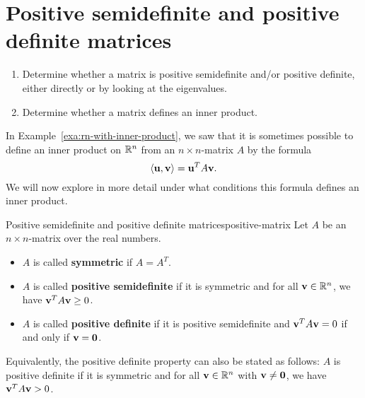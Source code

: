 \section{Positive semidefinite and positive definite matrices}

\begin{outcome}
  \begin{enumerate}
  \item Determine whether a matrix is positive semidefinite and/or
    positive definite, either directly or by looking at the
    eigenvalues.
  \item Determine whether a matrix defines an inner product.
  \end{enumerate}
\end{outcome}

In Example~\ref{exa:rn-with-inner-product}, we saw that it is
sometimes possible to define an inner product on $\mathbb{R}^n$ from an
$n\times n$-matrix $A$ by the formula
\begin{equation*}
  \iprod{\vect{u},\vect{v}} = \vect{u}^T A \vect{v}.
\end{equation*}
We will now explore in more detail under what conditions this formula
defines an inner product.

\begin{definition}{Positive semidefinite and positive definite matrices}{positive-matrix}
  Let $A$ be an $n\times n$-matrix over the real numbers.
  \begin{itemize}
  \item $A$ is called \textbf{symmetric}%
     if $A=A^T$.
  \item $A$ is called \textbf{positive semidefinite}%
     if it is symmetric and for all
    $\vect{v}\in\R^n$, we have $\vect{v}^TA\vect{v}\geq 0$.
  \item $A$ is called \textbf{positive definite}%
     if it is positive semidefinite
    and $\vect{v}^TA\vect{v}=0$ if and only if $\vect{v}=\vect{0}$.
\end{itemize}
\end{definition}

Equivalently, the positive definite property can also be stated as
follows: $A$ is positive definite if it is symmetric and for all
$\vect{v}\in\R^n$ with $\vect{v}\neq\vect{0}$, we have
$\vect{v}^TA\vect{v}>0$.

